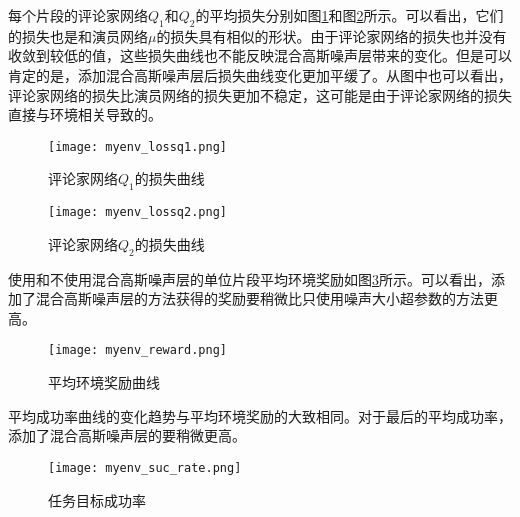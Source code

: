     每个片段的评论家网络$Q_1$和$Q_2$的平均损失分别如图\ref{fcn_lossq1}和图\ref{fcn_lossq2}所示。可以看出，它们的损失也是和演员网络$\mu$的损失具有相似的形状。由于评论家网络的损失也并没有收敛到较低的值，这些损失曲线也不能反映混合高斯噪声层带来的变化。但是可以肯定的是，添加混合高斯噪声层后损失曲线变化更加平缓了。从图中也可以看出，评论家网络的损失比演员网络的损失更加不稳定，这可能是由于评论家网络的损失直接与环境相关导致的。

        \begin{figure}[htpb]
        \centering
        \texttt{[image: myenv\_lossq1.png]}
        \caption{评论家网络$Q_1$的损失曲线}
            \label{fcn_lossq1}
        \end{figure}

        \begin{figure}[htpb]
        \centering
        \texttt{[image: myenv\_lossq2.png]}
        \caption{评论家网络$Q_2$的损失曲线}
            \label{fcn_lossq2}
        \end{figure}

        使用和不使用混合高斯噪声层的单位片段平均环境奖励如图\ref{fcn_reward}所示。可以看出，添加了混合高斯噪声层的方法获得的奖励要稍微比只使用噪声大小超参数的方法更高。

        \begin{figure}[htpb]
        \centering
        \texttt{[image: myenv\_reward.png]}
        \caption{平均环境奖励曲线}
            \label{fcn_reward}
        \end{figure}

        平均成功率曲线的变化趋势与平均环境奖励的大致相同。对于最后的平均成功率，添加了混合高斯噪声层的要稍微更高。

        \begin{figure}[htpb]
        \centering
        \texttt{[image: myenv\_suc\_rate.png]}
        \caption{任务目标成功率}
            \label{fcn_suc_rate}
        \end{figure}

